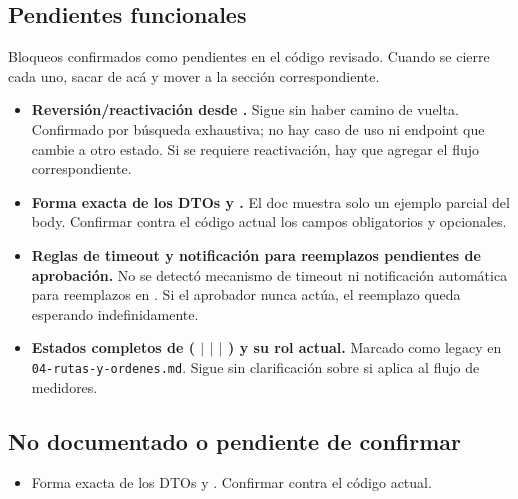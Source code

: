 \subsection{Pendientes funcionales}

Bloqueos confirmados como pendientes en el c\'odigo revisado. Cuando se cierre cada uno, sacar de ac\'a y mover a la secci\'on correspondiente.

\begin{itemize}
\item \textbf{Reversi\'on/reactivaci\'on desde \texttt{}.} Sigue sin haber camino de vuelta. Confirmado por b\'usqueda exhaustiva; no hay caso de uso ni endpoint que cambie \texttt{} a otro estado. Si se requiere reactivaci\'on, hay que agregar el flujo correspondiente.
\item \textbf{Forma exacta de los DTOs \texttt{} y \texttt{}.} El doc muestra solo un ejemplo parcial del body. Confirmar contra el c\'odigo actual los campos obligatorios y opcionales.
\item \textbf{Reglas de timeout y notificaci\'on para reemplazos pendientes de aprobaci\'on.} No se detect\'o mecanismo de timeout ni notificaci\'on autom\'atica para reemplazos en \texttt{}. Si el aprobador nunca act\'ua, el reemplazo queda esperando indefinidamente.
\item \textbf{Estados completos de \texttt{} (\texttt{} $|$ \texttt{} $|$ \texttt{} $|$ \texttt{}) y su rol actual.} Marcado como legacy en \texttt{04-rutas-y-ordenes.md}. Sigue sin clarificaci\'on sobre si aplica al flujo de medidores.
\end{itemize}

\subsection{No documentado o pendiente de confirmar}


\begin{itemize}
\item Forma exacta de los DTOs \texttt{} y \texttt{}. Confirmar contra el c\'odigo actual.
\end{itemize}
